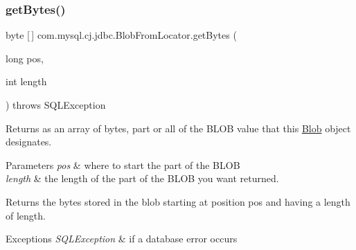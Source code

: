 \mbox{\label{classcom_1_1mysql_1_1cj_1_1jdbc_1_1_blob_from_locator_ac9d460d4f9f59946014b373d7d703564}} 
\subsubsection{\texorpdfstring{get\+Bytes()}{getBytes()}}
{\footnotesize\ttfamily byte \mbox{[}$\,$\mbox{]} com.\+mysql.\+cj.\+jdbc.\+Blob\+From\+Locator.\+get\+Bytes (\begin{DoxyParamCaption}\item[{long}]{pos,  }\item[{int}]{length }\end{DoxyParamCaption}) throws S\+Q\+L\+Exception}

Returns as an array of bytes, part or all of the B\+L\+OB value that this \mbox{\hyperlink{classcom_1_1mysql_1_1cj_1_1jdbc_1_1_blob}{Blob}} object designates.


\begin{DoxyParams}{Parameters}
{\em pos} & where to start the part of the B\+L\+OB \\
\hline
{\em length} & the length of the part of the B\+L\+OB you want returned.\\
\hline
\end{DoxyParams}
\begin{DoxyReturn}{Returns}
the bytes stored in the blob starting at position {\ttfamily pos} and having a length of {\ttfamily length}.
\end{DoxyReturn}

\begin{DoxyExceptions}{Exceptions}
{\em S\+Q\+L\+Exception} & if a database error occurs \\
\hline
\end{DoxyExceptions}
\mbox{\label{classcom_1_1mysql_1_1cj_1_1jdbc_1_1_blob_from_locator_a6eea7dd5b29ebcd066beac855648fe35}} 
